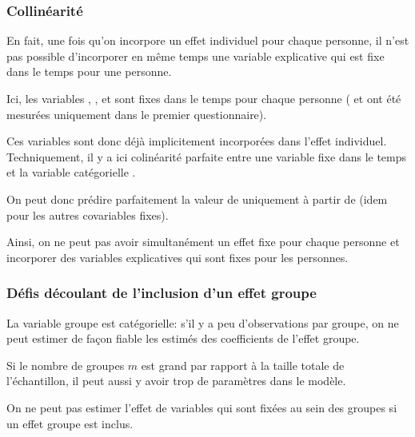 \documentclass{beamer}
\begin{document}
\begin{frame}[fragile]
\frametitle{Collinéarité}
\bi
\item  En fait, une fois qu'on incorpore un effet individuel pour chaque personne, \alert{il n'est pas possible d'incorporer en même temps une variable explicative qui est fixe dans le temps pour une personne}. 
\item Ici, les variables , ,  et  sont fixes dans le temps pour chaque personne ( et  ont été mesurées uniquement dans le premier questionnaire).  
\item Ces variables sont donc déjà implicitement incorporées dans l'effet individuel. Techniquement, il y a ici \alert{colinéarité parfaite} entre une variable fixe dans le temps et la variable catégorielle . 
\item On peut donc prédire parfaitement la valeur de  uniquement à partir de  (idem pour les autres covariables fixes). 
\item Ainsi, on ne peut pas avoir simultanément un effet fixe pour chaque personne et incorporer des variables explicatives qui sont fixes pour les personnes.
\ei
\end{frame}

 \begin{frame}
 \frametitle{Défis découlant de l'inclusion d'un effet groupe}
 
 \bi 
 \item La variable groupe est catégorielle: s'il y a peu d'observations par groupe, on ne peut estimer de façon fiable les estimés des coefficients de l'effet groupe.
 \item Si le nombre de groupes $m$ est grand par rapport à la taille totale de l'échantillon, il peut aussi y avoir trop de paramètres dans le modèle. 
 \item On ne peut pas estimer l'effet de variables qui sont fixées au sein des groupes si un effet groupe est inclus.
 \ei
\end{frame}
\end{document}
